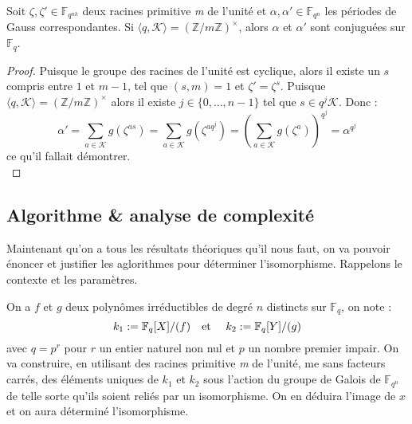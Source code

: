 \documentclass[a4paper]{article} %
\numberwithin{section}{part}
\numberwithin{equation}{section}
\newcommand\nroot[1]{\textit{#1}\up{\textit{ième}}}
\newcommand\zmodninv[1]{(\mathbb{Z}/#1\mathbb{Z})^{\times}}
\newcommand\GF[1]{\mathbb{F}_{#1}}
\newcommand\etmath{\textup{\quad et \quad}}
\begin{document}
\begin{lem}
\label{lem:gaussconj}
Soit $\zeta, \zeta'\in\GF{q^{nk}}$ deux racines primitive \nroot{m} de l'unité
et $\alpha, \alpha'\in\GF{q^{n}}$ les périodes de Gauss correspondantes. Si
$\langle q,\mathcal{K}\rangle=\zmodninv{m}$, alors $\alpha$ et $\alpha'$ sont
conjuguées sur $\GF{q}$.
\end{lem}
\begin{proof}
Puisque le groupe des racines de l'unité est cyclique, alors il existe un $s$
compris entre $1$ et $m-1$, tel que $(s, m) = 1$ et $\zeta' = \zeta^s$. Puisque
$\langle q, \mathcal{K}\rangle = \zmodninv{m}$ alors il existe
$j\in\lbrace{0,\dots,n-1}\rbrace$ tel que $s\in q^j\mathcal{K}$. Donc :
\[\alpha' = \sum_{a\in\mathcal{K}}{g(\zeta^{as})} =
\sum_{a\in\mathcal{K}}{g(\zeta^{aq^j})} =
\left(\sum_{a\in\mathcal{K}}{g(\zeta^a)}\right)^{q^j} = \alpha^{q^j}\]
ce qu'il fallait démontrer.\\
\end{proof}


\subsection{Algorithme \& analyse de complexité}
Maintenant qu'on a tous les résultats théoriques qu'il nous faut, on va pouvoir
énoncer et justifier les aglorithmes pour déterminer l'isomorphisme. Rappelons
le contexte et les paramètres.\par
On a $f$ et $g$ deux polynômes irréductibles de degré $n$ distincts sur
$\GF{q}$, on note :
\[k_1 := \GF{q}[X]/(f)\etmath k_2 := \GF{q}[Y]/(g)\]
avec $q = p^r$ pour $r$ un entier naturel non nul et $p$ un nombre premier
impair. On va construire, en utilisant des racines primitive \nroot{m} de 
l'unité, me sans facteurs carrés, des éléments uniques de $k_1$ et $k_2$ sous 
l'action du groupe de Galois de $\GF{q^n}$ de telle sorte qu'ils soient reliés 
par un isomorphisme. On en déduira l'image de $x$ et on aura déterminé
l'isomorphisme.
\end{document}
